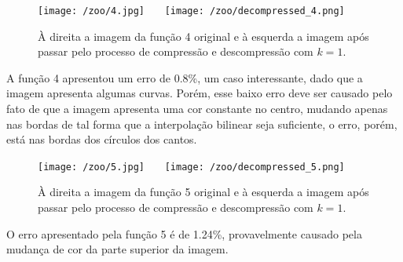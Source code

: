 \documentclass{article}
\begin{document}
		\begin{figure}[H]
			\centering
			\captionsetup{justification=centering}
			\texttt{[image: /zoo/4.jpg]} \ \ \
			\texttt{[image: /zoo/decompressed\_4.png]} \\
			\caption{À direita a imagem da função 4 original e à esquerda a imagem após passar pelo processo de compressão e descompressão com $k = 1$.}  
		\end{figure}\par
		A função 4 apresentou um erro de 0.8\%, um caso interessante, dado que a imagem apresenta algumas curvas. Porém, esse baixo erro deve ser causado pelo fato de que a imagem apresenta uma cor constante no centro, mudando apenas nas bordas de tal forma que a interpolação bilinear seja suficiente, o erro, porém, está nas bordas dos círculos dos cantos.
		
		\begin{figure}[H]
			\centering
			\captionsetup{justification=centering}
			\texttt{[image: /zoo/5.jpg]} \ \ \
			\texttt{[image: /zoo/decompressed\_5.png]} \\
			\caption{À direita a imagem da função 5 original e à esquerda a imagem após passar pelo processo de compressão e descompressão com $k = 1$.}  
		\end{figure}\par
		O erro apresentado pela função 5 é de 1.24\%, provavelmente causado pela mudança de cor da parte superior da imagem.
		
\end{document}
